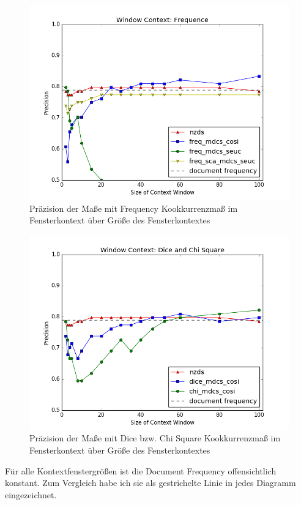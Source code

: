 \documentclass[11pt,numbers=noenddot]{scrartcl}
\begin{document}
\begin{figure}
    \includegraphics[width = \textwidth]{win_freq}
    \caption{Präzision der Maße mit Frequency Kookkurrenzmaß im Fensterkontext über Größe des Fensterkontextes}
    \label{win_freq}
\end{figure}
\begin{figure}
    \includegraphics[width = \textwidth]{win_dice_chi}
    \caption{Präzision der Maße mit Dice bzw. Chi Square Kookkurrenzmaß im Fensterkontext über Größe des Fensterkontextes}
    \label{win_dice_chi}
\end{figure}
Für alle Kontextfenstergrößen ist die Document Frequency offensichtlich konstant. Zum Vergleich habe ich sie als gestrichelte Linie in jedes Diagramm eingezeichnet.
\end{document}
